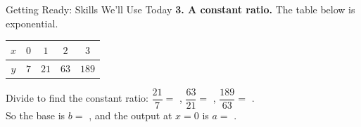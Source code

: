 \documentclass[10pt]{article}
\begin{document}
\begin{notesbox}{Getting Ready: Skills We'll Use Today}
\vspace{2pt}
\textbf{3. A constant ratio.} The table below is exponential.
\begin{center}
\renewcommand{\arraystretch}{1.3}
\begin{tabular}{|c|c|c|c|c|}
\hline
$x$ & $0$ & $1$ & $2$ & $3$ \\ \hline
$y$ & $7$ & $21$ & $63$ & $189$ \\ \hline
\end{tabular}
\end{center}
Divide to find the constant ratio: $\dfrac{21}{7}=$ \blank{1.0cm}, \; $\dfrac{63}{21}=$
\blank{1.0cm}, \; $\dfrac{189}{63}=$ \blank{1.0cm}. \\[3pt]
So the base is $b=$ \blank{1.2cm}, and the output at $x=0$ is $a=$ \blank{1.2cm}.

\end{notesbox}
\end{document}
